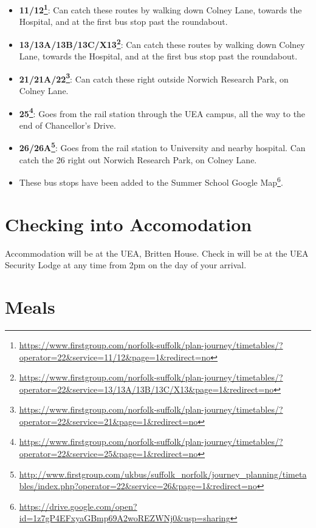 \documentclass[12pt,]{book}
\providecommand{\tightlist}{%
  \setlength{\itemsep}{0pt}\setlength{\parskip}{0pt}}
\let\rmarkdownfootnote\footnote%
\def\footnote{\protect\rmarkdownfootnote}
\renewcommand{\href}[2]{#2\footnote{\url{#1}}}
\theoremstyle{definition}
\theoremstyle{definition}
\theoremstyle{remark}
\begin{document}
\begin{itemize}
\tightlist
\item
  \textbf{\href{https://www.firstgroup.com/norfolk-suffolk/plan-journey/timetables/?operator=22\&service=11/12\&page=1\&redirect=no}{11/12}}:
  Can catch these routes by walking down Colney Lane, towards the
  Hospital, and at the first bus stop past the roundabout.
\item
  \textbf{\href{https://www.firstgroup.com/norfolk-suffolk/plan-journey/timetables/?operator=22\&service=13/13A/13B/13C/X13\&page=1\&redirect=no}{13/13A/13B/13C/X13}}:
  Can catch these routes by walking down Colney Lane, towards the
  Hospital, and at the first bus stop past the roundabout.
\item
  \textbf{\href{https://www.firstgroup.com/norfolk-suffolk/plan-journey/timetables/?operator=22\&service=21\&page=1\&redirect=no}{21/21A/22}}:
  Can catch these right outside Norwich Research Park, on Colney Lane.
\item
  \textbf{\href{https://www.firstgroup.com/norfolk-suffolk/plan-journey/timetables/?operator=22\&service=25\&page=1\&redirect=no}{25}}:
  Goes from the rail station through the UEA campus, all the way to the
  end of Chancellor's Drive.
\item
  \textbf{\href{http://www.firstgroup.com/ukbus/suffolk_norfolk/journey_planning/timetables/index.php?operator=22\&service=26\&page=1\&redirect=no}{26/26A}}:
  Goes from the rail station to University and nearby hospital. Can
  catch the 26 right out Norwich Research Park, on Colney Lane.
\item
  These bus stops have been added to the
  \href{https://drive.google.com/open?id=1z7gP4EFxyaGBmp69A2woREZWNj0\&usp=sharing}{Summer
  School Google Map}.
\end{itemize}

\section*{Checking into Accomodation}\label{checking-into-accomodation}

Accommodation will be at the UEA, Britten House. Check in will be at the
UEA Security Lodge at any time from 2pm on the day of your arrival.

\section*{Meals}\label{meals}
\end{document}
